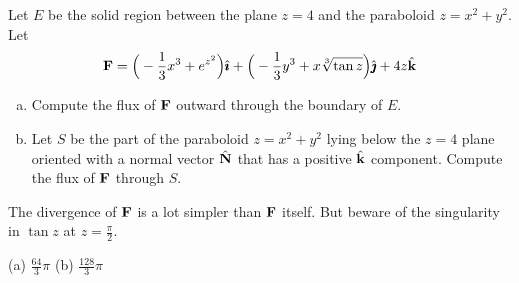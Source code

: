 \begin{question}[M317 2015A]  %
Let $E$ be the solid region between the plane $z = 4$ and the paraboloid 
$z = x^2 + y^2$. Let
\begin{equation*}
\vF = \Big(-\frac{1}{3}x^3 + e^{z^2}\Big)\hi 
     + \Big(-\frac{1}{3}y^3 + x\root{3}\of{\tan z}\Big)\hj + 4z\hk
\end{equation*}
\begin{enumerate}[(a)]
\item
Compute the flux of $\mathbf{F}$ outward through the boundary of $E$.

\item
Let $S$ be the part of the paraboloid $z = x^2 + y^2$ lying below the 
$z = 4$ plane oriented with a normal vector $\hat{\mathbf{N}}$ that has a positive $\hat{\mathbf{k}}$ component. 
Compute the flux of $\mathbf{F}$ through $S$.
\end{enumerate}

\end{question}

\begin{hint} 
The divergence of $\mathbf{F}$ is a lot simpler than $\mathbf{F}$ itself.
But beware of the singularity in $\tan z$ at $z=\tfrac{\pi}{2}$.
\end{hint}

\begin{answer} 
(a) $\frac{64}{3}\pi$\qquad
(b) $\frac{128}{3}\pi$
\end{answer}

